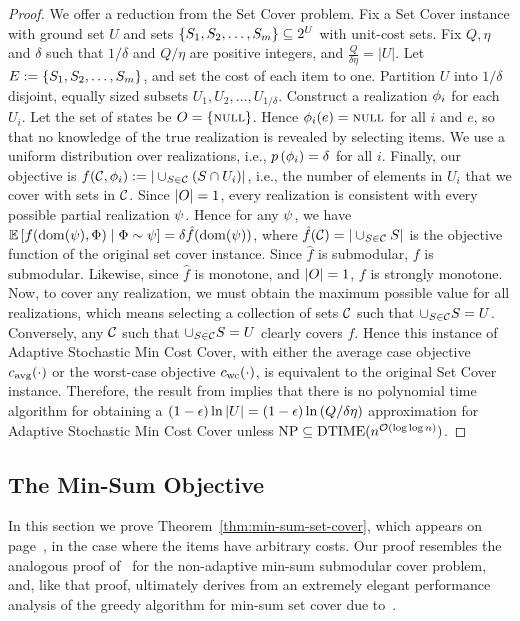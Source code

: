 \begin{proof}
We offer a reduction from the Set Cover problem.  Fix a Set Cover 
instance with ground set $U$ and sets $\left\{S_1, S_2, \ldots, S_m\right\} \subseteq 2^{U}$ with
unit-cost sets.
Fix $Q, \eta$ and $\delta$ such that $1/\delta$ and $Q/\eta$ are
positive integers, and $\frac{Q}{\delta \eta} = |U|$.
Let $E := \left\{S_1, S_2, \ldots, S_m\right\}$, and set the cost of
each item to one.  
Partition $U$ into $1/\delta$ disjoint, equally sized subsets 
$U_1, U_2, \ldots, U_{1/\delta}$.  Construct a realization 
${\color{black}{\ensuremath{\phi}}}_i$ for each $U_i$.  Let the set of states be $O = \left\{\textsc{null}\right\}$.
Hence ${\color{black}{\ensuremath{\phi}}}_i(e) = \textsc{null}$ for all $i$ and $e$, so that 
no knowledge of the true realization is revealed by selecting items.
We use a uniform distribution over
realizations, i.e., ${\color{black}{\ensuremath{p \left( {{\color{black}{\ensuremath{\phi}}}_i} \right) }}} = \delta$ for all $i$.
Finally, our objective is 
$f(\mathcal{C}, {\color{black}{\ensuremath{\phi}}}_i) := | \cup_{S \in \mathcal{C}}  (S \cap U_i )
|$, i.e., the number of elements in $U_i$ that we cover with sets in
$\mathcal{C}$.
Since $|O| = 1$, every realization is consistent with every
possible partial realization ${\color{black}{\ensuremath{\psi}}}$.  Hence for any ${\color{black}{\ensuremath{\psi}}}$, we have 
$ \mathbb{E}\left[f(\operatorname{dom}({{\color{black}{\ensuremath{\psi}}}}), {\color{black}{\ensuremath{\Phi}}}) \mid {\color{black}{\ensuremath{\Phi}}} \sim {{\color{black}{\ensuremath{\psi}}}}\right]  = \delta \hat{f}(\operatorname{dom}({\color{black}{\ensuremath{\psi}}}))$, where 
$\hat{f}( \mathcal{C} ) = | \cup_{S \in \mathcal{C}} S |$ is the
objective function of the original set cover instance.
Since $\hat{f}$ is submodular, $f$ is \term submodular.
Likewise, since $\hat{f}$ is monotone, and $|O| = 1$, 
$f$ is strongly \term monotone.
Now, to cover any realization, we must obtain the maximum possible
value for all realizations, which means selecting a collection of sets
$\mathcal{C}$ such that $\cup_{S \in \mathcal{C}} S = U$.
Conversely, any $\mathcal{C}$ such that $\cup_{S \in \mathcal{C}} S =
U$ clearly covers $f$.  Hence this instance of Adaptive Stochastic Min
Cost Cover, 
with either the average case
objective ${c_{\text{avg}}{(\cdot)}}$ or the worst-case objective ${c_{\text{wc}}{(\cdot)}}$,
is equivalent to the original Set Cover instance.
Therefore, the result 
from \citet{feige98threshold} implies that there is no polynomial
time algorithm for obtaining a $(1-\epsilon)\ln |U| =
(1-\epsilon)\ln  \left( {Q/\delta\eta} \right) $ approximation for Adaptive Stochastic Min
Cost Cover unless 
$\textrm{NP}\subseteq
\text{DTIME}(n^{{\mathcal{O}}(\log\log n)})$.
\end{proof}

%
\subsection{The Min-Sum Objective} \label{sec:proofs-min-sum-cover}  
%
\noindent In this section we prove
Theorem~\ref{thm:min-sum-set-cover}, which appears on page~\pageref{thm:min-sum-set-cover},
in the case where the items have arbitrary costs.  
Our proof 
resembles the analogous proof of~\citet{streeter07tr} for the non-adaptive min-sum
submodular cover problem, and, like that
proof, ultimately derives from an extremely elegant performance analysis
of the greedy algorithm for min-sum set cover due to~\citet{feige04}.\\
%


